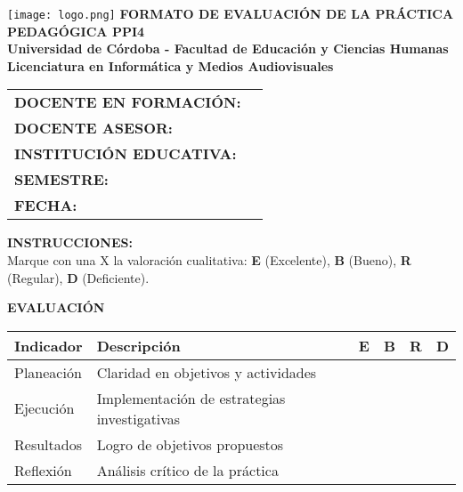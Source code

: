 \documentclass[a4paper,12pt]{article}
\begin{document}
\begin{center}
    \vspace*{1cm}
    \texttt{[image: logo.png]} %
    \vspace{0.5cm}
    \textbf{\Large FORMATO DE EVALUACIÓN DE LA PRÁCTICA PEDAGÓGICA PPI4} \\
    \vspace{0.5cm}
    \textbf{Universidad de Córdoba - Facultad de Educación y Ciencias Humanas} \\
    \textbf{Licenciatura en Informática y Medios Audiovisuales}
\end{center}

\vspace{0.5cm}
\begin{tabularx}{\textwidth}{@{}p{5cm}X@{}}
    \toprule
    \textbf{DOCENTE EN FORMACIÓN:} & \hrulefill \\
    \textbf{DOCENTE ASESOR:} & \hrulefill \\
    \textbf{INSTITUCIÓN EDUCATIVA:} & \hrulefill \\
    \textbf{SEMESTRE:} & \hrulefill \\
    \textbf{FECHA:} & \hrulefill \\
    \bottomrule
\end{tabularx}

\vspace{0.5cm}
\noindent
\textbf{INSTRUCCIONES:} \\
Marque con una X la valoración cualitativa: \textbf{E} (Excelente), \textbf{B} (Bueno), \textbf{R} (Regular), \textbf{D} (Deficiente).

\vspace{0.5cm}
\noindent
\textbf{EVALUACIÓN}
\begin{table}[h]
    \centering
    \scriptsize
    \begin{tabularx}{\textwidth}{|p{5cm}|X|c|c|c|c|}
        \hline
        \textbf{Indicador} & \textbf{Descripción} & \textbf{E} & \textbf{B} & \textbf{R} & \textbf{D} \\
        \hline
        Planeación & Claridad en objetivos y actividades & & & & \\ \hline
        Ejecución & Implementación de estrategias investigativas & & & & \\ \hline
        Resultados & Logro de objetivos propuestos & & & & \\ \hline
        Reflexión & Análisis crítico de la práctica & & & & \\ \hline
    \end{tabularx}
\end{table}
\end{document}
